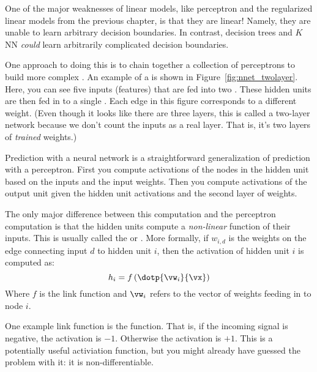One of the major weaknesses of linear models, like perceptron and the
regularized linear models from the previous chapter, is that they are
linear!  Namely, they are unable to learn arbitrary decision
boundaries.  In contrast, decision trees and $K$NN \emph{could} learn
arbitrarily complicated decision boundaries.


One approach to doing this is to chain together a collection of
perceptrons to build more complex .  An
example of a  is shown in
Figure~\ref{fig:nnet_twolayer}.  Here, you can see five inputs
(features) that are fed into two .  These hidden
units are then fed in to a single .  Each edge in
this figure corresponds to a different weight.  (Even though it looks
like there are three layers, this is called a two-layer network
because we don't count the inputs as a real layer.  That is, it's two
layers of \emph{trained} weights.)

Prediction with a neural network is a straightforward generalization
of prediction with a perceptron.  First you compute activations of the
nodes in the hidden unit based on the inputs and the input weights.
Then you compute activations of the output unit given the hidden unit
activations and the second layer of weights.

The only major difference between this computation and the perceptron
computation is that the hidden units compute a \emph{non-linear}
function of their inputs.  This is usually called the
 or .  More
formally, if $w_{i,d}$ is the weights on the edge connecting input $d$
to hidden unit $i$, then the activation of hidden unit $i$ is computed
as:
%
\begin{equation}
  h_i = f\left( \dotp{\vw_i}{\vx} \right)
\end{equation}
%
Where $f$ is the link function and $\vw_i$ refers to the
vector of weights feeding in to node $i$.

One example link function is the  function.  That is, if
the incoming signal is negative, the activation is $-1$.  Otherwise
the activation is $+1$.  This is a potentially useful activiation
function, but you might already have guessed the problem with it: it
is non-differentiable.


